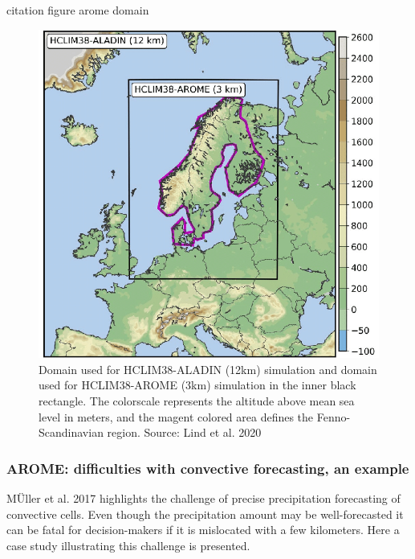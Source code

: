 \cite{lind_arome} citation figure arome domain 
\begin{figure}[hbt!]
    \centering
    \includegraphics[scale=0.4]{figures/arome_domain.png}
    \caption{Domain used for HCLIM38-ALADIN (12km) simulation and domain used for HCLIM38-AROME (3km) simulation in the inner black rectangle. The colorscale represents the altitude above mean sea level in meters, and the magent colored area defines the Fenno-Scandinavian region. Source: Lind et al. 2020 \cite{lind_arome}}
    \label{fig:arome_domain}
\end{figure}

\subsubsection{AROME: difficulties with convective forecasting, an example}

MÜller et al. 2017 \cite{muller} highlights the challenge of precise precipitation forecasting of convective cells. Even though the precipitation amount may be well-forecasted it can be fatal for decision-makers if it is mislocated with a few kilometers. Here a case study illustrating this challenge is presented. 


